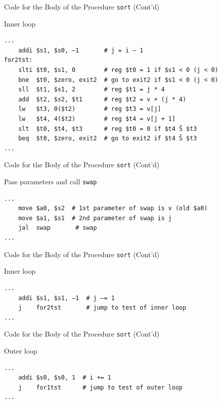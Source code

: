 \begin{frame}[fragile]{Code for the Body of the Procedure \texttt{sort} (Cont'd)}
\begin{flushleft}
Inner loop
\begin{lstlisting}[keywordstyle=\color{purple}\textbf, keywords={addi, slti, bne, add, sll, lw, slt, beq}, numbers=none]
...
    addi $s1, $s0, –1       # j = i – 1
for2tst: 
    slti $t0, $s1, 0        # reg $t0 = 1 if $s1 < 0 (j < 0)
    bne  $t0, $zero, exit2  # go to exit2 if $s1 < 0 (j < 0)
    sll  $t1, $s1, 2        # reg $t1 = j * 4
    add  $t2, $s2, $t1      # reg $t2 = v + (j * 4)
    lw   $t3, 0($t2)        # reg $t3 = v[j]
    lw   $t4, 4($t2)        # reg $t4 = v[j + 1]
    slt  $t0, $t4, $t3      # reg $t0 = 0 if $t4 Š $t3
    beq  $t0, $zero, exit2  # go to exit2 if $t4 Š $t3
...
\end{lstlisting}
\end{flushleft}
\end{frame}

\begin{frame}[fragile]{Code for the Body of the Procedure \texttt{sort} (Cont'd)}
    \begin{flushleft}
Pass parameters and call \texttt{swap}
\begin{lstlisting}[keywordstyle=\color{purple}\textbf, keywords={move, jal}, numbers=none]
...
    move $a0, $s2  # 1st parameter of swap is v (old $a0)
    move $a1, $s1  # 2nd parameter of swap is j
    jal  swap       # swap
...
\end{lstlisting}
\end{flushleft}
\end{frame}

\begin{frame}[fragile]{Code for the Body of the Procedure \texttt{sort} (Cont'd)}
\begin{flushleft}
Inner loop
\begin{lstlisting}[keywordstyle=\color{purple}\textbf, keywords={addi, j}, numbers=none]
...
    addi $s1, $s1, –1  # j –= 1
    j    for2tst       # jump to test of inner loop
...
\end{lstlisting}
\end{flushleft}
\end{frame}

\begin{frame}[fragile]{Code for the Body of the Procedure \texttt{sort} (Cont'd)}
\begin{flushleft}
Outer loop
\begin{lstlisting}[keywordstyle=\color{purple}\textbf, keywords={addi, j}, numbers=none]
...
    addi $s0, $s0, 1  # i += 1
    j    for1tst      # jump to test of outer loop
...
\end{lstlisting}
\end{flushleft}
\end{frame}

